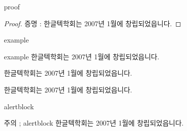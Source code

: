 \documentclass[10pt,blue,xcolor=pdftex,dvipsnames,table,handout]{beamer}
\begin{document}
		\begin{frame}[t]{proof}

			\begin{proof}
			증명 : 한글텍학회는 2007년 1월에 창립되었읍니다.	
			\end{proof}

		\end{frame}


		\begin{frame}[t]{example}

			\begin{example} {example}
			한글텍학회는 2007년 1월에 창립되었읍니다.	
			\end{example}

			\begin{example} {}
			한글텍학회는 2007년 1월에 창립되었읍니다.	
			\end{example}

			\begin{example}
			한글텍학회는 2007년 1월에 창립되었읍니다.	
			\end{example}


		\end{frame}


		\begin{frame}[t]{alertblock}

			\begin{alertblock} {주의 ; alertblock}
			한글텍학회는 2007년 1월에 창립되었읍니다.	
			\end{alertblock}

		\end{frame}
\end{document}
